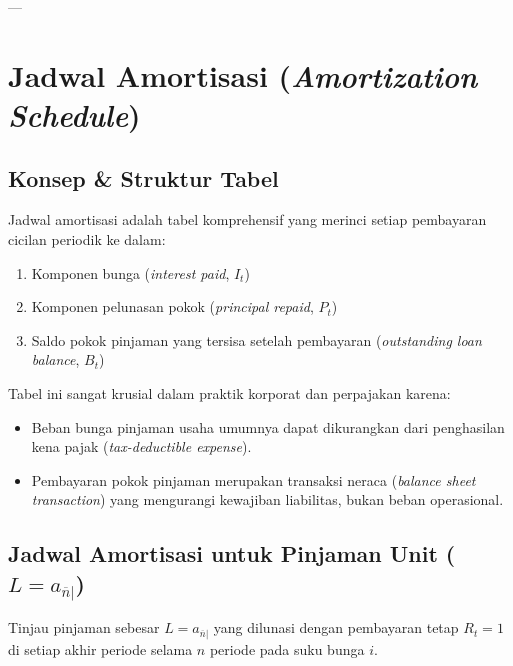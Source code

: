 \documentclass[11pt,a4paper]{article}
\begin{document}
---

\section{Jadwal Amortisasi (\textit{Amortization Schedule})}

\subsection{Konsep \& Struktur Tabel}

\begin{definitionbox}
Jadwal amortisasi adalah tabel komprehensif yang merinci setiap pembayaran cicilan periodik ke dalam:
\begin{enumerate}
    \item Komponen bunga (\textit{interest paid}, $I_t$)
    \item Komponen pelunasan pokok (\textit{principal repaid}, $P_t$)
    \item Saldo pokok pinjaman yang tersisa setelah pembayaran (\textit{outstanding loan balance}, $B_t$)
\end{enumerate}
\end{definitionbox}

Tabel ini sangat krusial dalam praktik korporat dan perpajakan karena:
\begin{itemize}
    \item Beban bunga pinjaman usaha umumnya dapat dikurangkan dari penghasilan kena pajak (\textit{tax-deductible expense}).
    \item Pembayaran pokok pinjaman merupakan transaksi neraca (\textit{balance sheet transaction}) yang mengurangi kewajiban liabilitas, bukan beban operasional.
\end{itemize}

\subsection{Jadwal Amortisasi untuk Pinjaman Unit (\texorpdfstring{$L = a_{\overline{n}|}$}{L = a\_n})}

Tinjau pinjaman sebesar $L = a_{\overline{n}|}$ yang dilunasi dengan pembayaran tetap $R_t = 1$ di setiap akhir periode selama $n$ periode pada suku bunga $i$.
\end{document}
